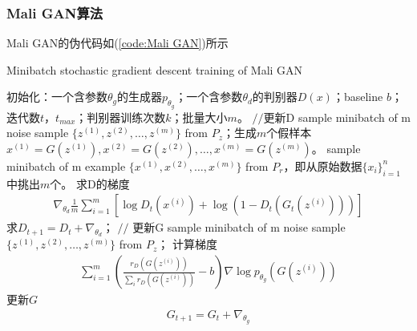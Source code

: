         \subsubsection{Mali GAN算法}
            \par
            Mali GAN的伪代码如(\ref{code:Mali GAN})所示
            \begin{algorithm}[H]
                \caption{Minibatch stochastic gradient descent training of Mali GAN}\label{code:Mali GAN}
                \begin{algorithmic}[1]
                    \State 初始化：一个含参数$\theta_g$的生成器$p_{\theta_g}$；一个含参数$\theta_d$的判别器$D(x)$；baseline $b$；迭代数$t$，$t_{max}$；判别器训练次数$k$；批量大小$m$。
                        \State $//$更新D
                            \State sample minibatch of m noise sample $\{z^{(1)},z^{(2)},\dots,z^{(m)}\}$ from $P_z$；生成$m$个假样本$x^{(1)} = G(z^{(1)}),x^{(2)} = G(z^{(2)}),\dots,x^{(m)} = G(z^{(m)})$。
                            \State sample minibatch of m example $\{x^{(1)},x^{(2)},\dots,x^{(m)}\}$ from $P_r$，即从原始数据$\{x_i\}_{i=1}^n$中挑出$m$个。
                            \State 求D的梯度
                            \begin{align*}
                            \nabla_{\theta_d} \frac{1}{m} \sum_{i=1}^m [\log D_t(x^{(i)})+\log (1-D_t(G_t(z^{(i)})))]
                            \end{align*}
                            \State 求$D_{t+1} = D_t+\nabla_{\theta_d}$；
                        \EndFor
                        \State $//$ 更新G
                        \State sample minibatch of m noise sample $\{z^{(1)},z^{(2)},\dots,z^{(m)}\}$ from $P_z$；
                        \State 计算梯度
                        \begin{align*}
                        \sum_{i=1}^m \left( \frac{r_D(G(z^{(i)}))}{\sum_i r_D(G(z^{(i)}))} - b \right) \nabla \log p_{\theta_g}(G(z^{(i)}))
                        \end{align*}
                        \State 更新$G$
                        \begin{align*}
                        G_{t+1} = G_t + \nabla_{\theta_g}
                        \end{align*}
                    \EndFor
                \end{algorithmic}
            \end{algorithm}

